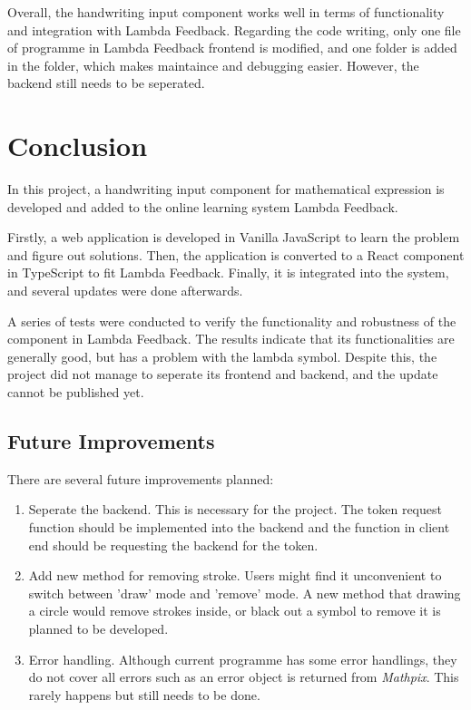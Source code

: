 \documentclass[12pt,twoside]{report}
\begin{document}
Overall, the handwriting input component works well in terms of functionality
and integration with Lambda Feedback. Regarding the code writing, only one file
of programme in Lambda Feedback frontend is modified, and one folder is added in
the  folder, which makes maintaince and debugging easier.
However, the backend still needs to be seperated.


\chapter{Conclusion}
\label{Conclusion}
In this project, a handwriting input component for mathematical expression is developed and added to the online learning system Lambda Feedback.

Firstly, a web application is developed in Vanilla JavaScript to learn the
problem and figure out solutions. Then, the application is converted to a React
component in TypeScript to fit Lambda Feedback. Finally, it is integrated into
the system, and several updates were done afterwards.

A series of tests were conducted to verify the functionality and robustness of
the component in Lambda Feedback. The results indicate that its functionalities
are generally good, but has a problem with the lambda symbol. Despite this, the
project did not manage to seperate its frontend and backend, and the update
cannot be published yet.

\section*{Future Improvements}
There are several future improvements planned:
\begin{enumerate}
    \item Seperate the backend. This is necessary for the project. The token request function should be implemented into the backend and the function in client end should be requesting the backend for the token.
    \item Add new method for removing stroke. Users might find it unconvenient to switch between 'draw' mode and 'remove' mode. A new method that drawing a circle would remove strokes inside, or black out a symbol to remove it is planned to be developed.
    \item Error handling. Although current programme has some error handlings, they do not cover all errors such as an error object is returned from \textit{Mathpix}. This rarely happens but still needs to be done.
\end{enumerate}



\end{document}

